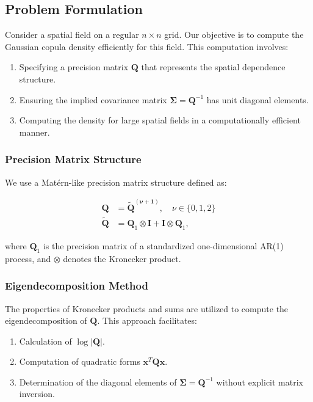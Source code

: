\documentclass[journal=,manuscript=]{achemso}
\providecommand{\tightlist}{%
  \setlength{\itemsep}{0pt}\setlength{\parskip}{0pt}}\usepackage{longtable,booktabs,array}
\begin{document}
\subsection{Problem Formulation}\label{problem-formulation}

Consider a spatial field on a regular \(n \times n\) grid. Our objective
is to compute the Gaussian copula density efficiently for this field.
This computation involves:

\begin{enumerate}
\def\labelenumi{\arabic{enumi}.}
\tightlist
\item
  Specifying a precision matrix \(\mathbf{Q}\) that represents the
  spatial dependence structure.
\item
  Ensuring the implied covariance matrix
  \(\mathbf{\Sigma} = \mathbf{Q}^{-1}\) has unit diagonal elements.
\item
  Computing the density for large spatial fields in a computationally
  efficient manner.
\end{enumerate}

\subsubsection{Precision Matrix
Structure}\label{precision-matrix-structure}

We use a Matérn-like precision matrix structure defined as:

\[
\begin{aligned}
\mathbf{Q} &= \mathbf{\tilde{Q}^{(\nu + 1)}}, \quad\nu \in \{0, 1, 2\}  \\
\mathbf{\tilde Q} &= \mathbf{Q}_1 \otimes \mathbf{I} + \mathbf{I} \otimes \mathbf{Q}_1,
\end{aligned}
\]

where \(\mathbf{Q}_1\) is the precision matrix of a standardized
one-dimensional AR(1) process, and \(\otimes\) denotes the Kronecker
product.

\subsubsection{Eigendecomposition
Method}\label{eigendecomposition-method}

The properties of Kronecker products and sums are utilized to compute
the eigendecomposition of \(\mathbf{Q}\). This approach facilitates:

\begin{enumerate}
\def\labelenumi{\arabic{enumi}.}
\tightlist
\item
  Calculation of \(\log |\mathbf{Q}|\).
\item
  Computation of quadratic forms \(\mathbf{x}^T\mathbf{Q}\mathbf{x}\).
\item
  Determination of the diagonal elements of
  \(\mathbf{\Sigma} = \mathbf{Q}^{-1}\) without explicit matrix
  inversion.
\end{enumerate}
\end{document}
